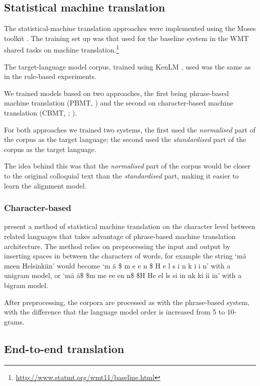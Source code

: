 \documentclass[11pt]{article}
\begin{document}
\subsection{Statistical machine translation}

The statistical-machine translation approaches were implemented using the 
Moses toolkit \cite{koehn2007}. The training set up was that used for
the baseline system in the WMT shared tasks
on machine translation.\footnote{\url{http://www.statmt.org/wmt11/baseline.html}}

The target-language model corpus, trained using KenLM \cite{heafield2011}, used was the same as in the rule-based experiments.  

We trained models based on two approaches, the first being phrase-based machine translation (PBMT, ) and the second on character-based machine translation (CBMT, ; ).

For both approaches we trained two systems, the first used the \emph{normalised}
part of the corpus as the target language; the second used the \emph{standardised} 
part of the corpus as the target language.

The idea behind this was that the \emph{normalised} part of the corpus would be closer
to the original colloquial text than the \emph{standardised} part, making it easier
to learn the alignment model. 

\subsubsection*{Character-based}

 present a method of statistical machine translation on the character level between related languages that takes advantage of phrase-based machine translation architecture. The method relies on preprocessing the input and output by inserting spaces in between the characters of words, for example the string `m\"{a} meen Helsinkiin' would become `m \"{a} \$ m e e n \$ H e l s i n k i i n' with a unigram model, or `m\"{a} \"{a}\$ \$m me ee en n\$ \$H He el ls si in nk ki ii in' with a bigram model.

After preprocessing, the corpora are processed as with the phrase-based system, with the difference that the language model order is increased from 5 to 10-grams.

\subsection{End-to-end translation}
\end{document}
